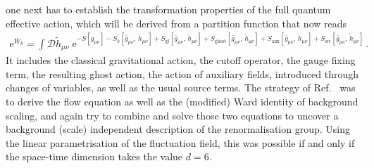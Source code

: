 \documentclass[11pt]{book}
\numberwithin{equation}{chapter}
\begin{document}
one next has to establish the transformation properties of the full quantum
effective action, which will be derived from a partition function that now reads
\begin{align}
  \mathrm e^{W_k} = \int \mathcal{D}\tilde h_{\mu\nu} \;
  \mathrm e^{
    - S[g_{\mu\nu}]
    - S_k[\bar g_{\mu\nu},\, \tilde h_{\mu\nu}]
    + S_{\mathrm{gf}}[\bar g_{\mu\nu},\, \tilde h_{\mu\nu}]
    + S_{\mathrm{ghost}}[\bar g_{\mu\nu},\, \tilde h_{\mu\nu}]
    + S_{\mathrm{aux}}[\bar g_{\mu\nu},\, \tilde h_{\mu\nu}]
    + S_{\mathrm{src}}[\bar g_{\mu\nu},\, \tilde h_{\mu\nu}]
  } \,.
\end{align}
It includes the classical gravitational action, the cutoff operator, the gauge fixing
term, the resulting ghost action, the action of auxiliary fields, introduced through
changes of variables, as well as the usual source terms. The strategy of
Ref.~\cite{Morris:2016spn} was to derive the flow equation as well as the (modified)
Ward identity of background scaling, and again try to combine and solve those two equations
to uncover a background (scale) independent description of the renormalisation group.
Using the linear parametrisation of the fluctuation field,
this was possible if and only if the space-time dimension takes the value $d=6$.
\end{document}
